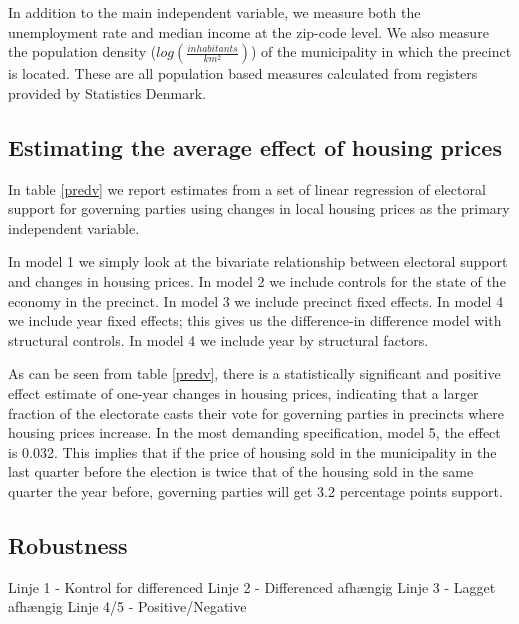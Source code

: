 \documentclass[12pt,a4paper]{article}
\begin{document}
In addition to the main independent variable, we measure both the unemployment rate and median income at the zip-code level. We also measure the population density ($log(\frac{inhabitants}{km^2})$) of the municipality in which the precinct is located. These are all population based measures calculated from registers provided by Statistics Denmark. 


\subsection{Estimating the average effect of housing prices}
In table \ref{predv}  we report estimates from a set of linear regression of electoral support for governing parties using changes in local housing prices as the primary independent variable.

In model 1 we simply look at the bivariate relationship between electoral support and changes in housing prices. In model 2 we include controls for the state of the economy in the precinct. In model 3 we include precinct fixed effects. In model 4 we include year fixed effects; this gives us the difference-in difference model with structural controls. In model 4 we include year by structural factors. 




As can be seen from table \ref{predv}, there is a statistically significant and positive effect estimate of one-year changes in housing prices, indicating that a larger fraction of the electorate casts their vote for governing parties in precincts where housing prices increase. In the most demanding specification, model 5, the effect is 0.032. This implies that if the price of housing sold in the municipality in the last quarter before the election is twice that of the housing sold in the same quarter the year before, governing parties will get 3.2 percentage points support.

\subsection{Robustness}

Linje 1 - Kontrol for differenced
Linje 2 - Differenced afhængig
Linje 3 - Lagget afhængig
Linje 4/5 - Positive/Negative  



%
\end{document}
